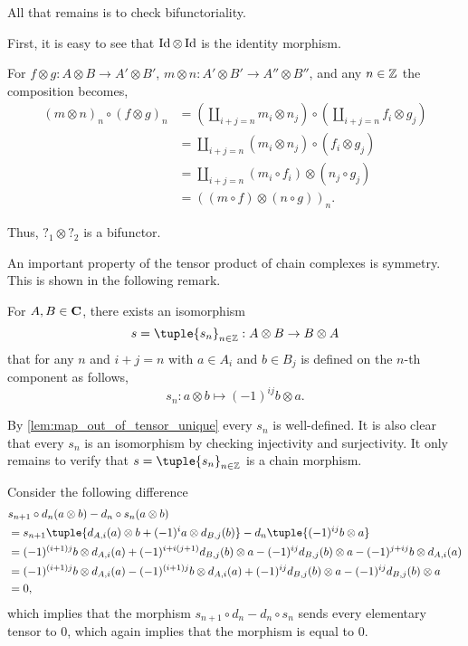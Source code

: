 \begin{remark}
    All that remains is to check bifunctoriality.

    First, it is easy to see that \( \operatorname{Id} \otimes \operatorname{Id} \) is the identity morphism.
    
    For \( f \otimes g: A \otimes B \to A' \otimes B' \), \( m \otimes n: A' \otimes B' \to A'' \otimes B'' \), and any \( n \in {\mathbb{Z}} \) the composition becomes,
    \begin{align*}
        (m \otimes n)_n \circ (f \otimes g)_n &= (\coprod_{i + j = n} m_i \otimes n_j) \circ (\coprod_{i + j = n} f_i \otimes g_j) \\
        &= \coprod_{i + j = n} (m_i \otimes n_j) \circ (f_i \otimes g_j) \\
        &= \coprod_{i + j = n} (m_i \circ f_i) \otimes (n_j \circ g_j) \\
        &= ((m \circ f) \otimes (n \circ g))_n.
    \end{align*}

    Thus, \( ?_1 \otimes ?_2 \) is a bifunctor.
\end{remark}

An important property of the tensor product of chain complexes is symmetry. This is shown in the following remark.

\begin{remark}
    \label{rem:symmetry_tensor_product_of_chain_complex}
    For \( A, B \in \operatorname{\mathbf{C}} \), there exists an isomorphism
    \[
        s = \tuple{s_n}_{n \in \Zb}: A \otimes B \to B \otimes A
    \]
    that for any \( n \) and \( i + j = n \) with \( a \in A_i \) and \( b \in B_j \) is defined on the \( n \)-th component as follows,
    \[
        s_n: a \otimes b \mapsto (-1)^{ij} b \otimes a.
    \]

    By \autoref{lem:map_out_of_tensor_unique} every \( s_n \) is well-defined. It is also clear that every \( s_n \) is an isomorphism by checking injectivity and surjectivity. It only remains to verify that \( s = \tuple{s_n}_{n \in \Zb} \) is a chain morphism.

    Consider the following difference
    \begin{align*}
        &s_{n + 1} \circ d_n(a \otimes b) - d_n \circ s_n (a \otimes b) \\
        &= s_{n + 1} \tuple{d_{A, i}(a) \otimes b + (-1)^i a \otimes d_{B, j}(b)} - d_n \tuple{ (-1)^{ij} b \otimes a } \\
        &= (-1)^{(i + 1)j} b \otimes d_{A, i}(a) + (-1)^{i + i(j + 1)} d_{B, j}(b) \otimes a - (-1)^{ij} d_{B, j}(b) \otimes a - (-1)^{j + ij} b \otimes d_{A, i}(a) \\
        &= (-1)^{(i + 1)j} b \otimes d_{A, i}(a) - (-1)^{(i + 1)j} b \otimes d_{A, i}(a) + (-1)^{ij} d_{B, j}(b) \otimes a - (-1)^{ij} d_{B, j}(b) \otimes a \\
        &= 0,
    \end{align*}
    which implies that the morphism \( s_{n + 1} \circ d_n - d_n \circ s_n \) sends every elementary tensor to \( 0 \), which again implies that the morphism is equal to \( 0 \).
\end{remark}

